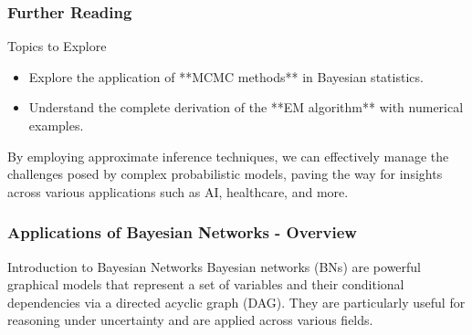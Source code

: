 \documentclass[aspectratio=169]{beamer}
\begin{document}
\begin{frame}[fragile]
  \frametitle{Further Reading}
  \begin{block}{Topics to Explore}
    \begin{itemize}
      \item Explore the application of **MCMC methods** in Bayesian statistics.
      \item Understand the complete derivation of the **EM algorithm** with numerical examples.
    \end{itemize}
  \end{block}
  
  By employing approximate inference techniques, we can effectively manage the challenges posed by complex probabilistic models, paving the way for insights across various applications such as AI, healthcare, and more.
\end{frame}

\begin{frame}[fragile]
  \frametitle{Applications of Bayesian Networks - Overview}
  \begin{block}{Introduction to Bayesian Networks}
    Bayesian networks (BNs) are powerful graphical models that represent a set of variables and their conditional dependencies via a directed acyclic graph (DAG). They are particularly useful for reasoning under uncertainty and are applied across various fields.
  \end{block}
\end{frame}
\end{document}
